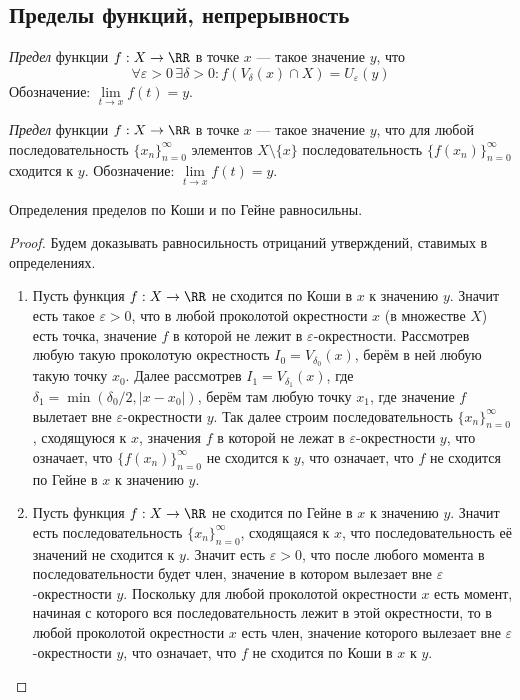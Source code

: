 \documentclass[12pt,a4paper]{article}
\begin{document}
    \subsection{Пределы функций, непрерывность}

    \begin{definition}[по Коши]
        \emph{Предел} функции $f: X \to \RR$ в точке $x$ --- такое значение $y$, что
        \[\forall \varepsilon > 0\, \exists \delta > 0: f(V_\delta(x) \cap X) = U_\varepsilon(y)\]
        Обозначение: $\lim\limits_{t \to x} f(t) = y$.
    \end{definition}

    \begin{definition}[по Гейне]
        \emph{Предел} функции $f: X \to \RR$ в точке $x$ --- такое значение $y$, что для любой последовательность $\{x_n\}_{n=0}^\infty$ элементов $X \setminus \{x\}$ последовательность $\{f(x_n)\}_{n=0}^\infty$ сходится к $y$. Обозначение: $\lim\limits_{t \to x} f(t) = y$.
    \end{definition}

    \begin{theorem}
        Определения пределов по Коши и по Гейне равносильны.
    \end{theorem}

    \begin{proof}
        Будем доказывать равносильность отрицаний утверждений, ставимых в определениях.
        \begin{enumerate}
            \item Пусть функция $f: X \to \RR$ не сходится по Коши в $x$ к значению $y$. Значит есть такое $\varepsilon > 0$, что в любой проколотой окрестности $x$ (в множестве $X$) есть точка, значение $f$ в которой не лежит в $\varepsilon$-окрестности. Рассмотрев любую такую проколотую окрестность $I_0 = V_{\delta_0}(x)$, берём в ней любую такую точку $x_0$. Далее рассмотрев $I_1 = V_{\delta_1}(x)$, где $\delta_1 = \min(\delta_0/2, |x-x_0|)$, берём там любую точку $x_1$, где значение $f$ вылетает вне $\varepsilon$-окрестности $y$. Так далее строим последовательность $\{x_n\}_{n=0}^\infty$, сходящуюся к $x$, значения $f$ в которой не лежат в $\varepsilon$-окрестности $y$, что означает, что $\{f(x_n)\}_{n=0}^\infty$ не сходится к $y$, что означает, что $f$ не сходится по Гейне в $x$ к значению $y$.
            \item Пусть функция $f: X \to \RR$ не сходится по Гейне в $x$ к значению $y$. Значит есть последовательность $\{x_n\}_{n=0}^\infty$, сходящаяся к $x$, что последовательность её значений не сходится к $y$. Значит есть $\varepsilon > 0$, что после любого момента в последовательности будет член, значение в котором вылезает вне $\varepsilon$-окрестности $y$. Поскольку для любой проколотой окрестности $x$ есть момент, начиная с которого вся последовательность лежит в этой окрестности, то в любой проколотой окрестности $x$ есть член, значение которого вылезает вне $\varepsilon$-окрестности $y$, что означает, что $f$ не сходится по Коши в $x$ к $y$.
        \end{enumerate}
    \end{proof}
\end{document}

